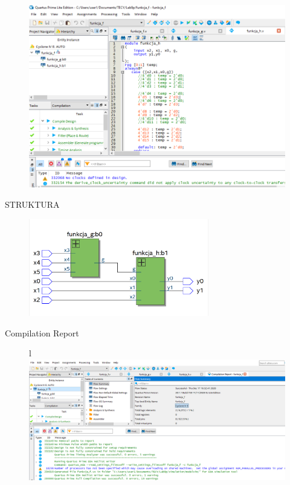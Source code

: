 \documentclass[]{article}
\begin{document}
\begin{figure}[H]
	\centering
	\includegraphics[width=1.39\textwidth]{1.17.png}
\end{figure}
\begin{center}
    STRUKTURA
\end{center}
\begin{figure}[H]
	\centering
	\includegraphics[width=0.70\textwidth]{1.18.png}
\end{figure}
\begin{center}
    Compilation Report
\end{center}
\begin{figure}[H]{l}
	\includegraphics[width=1.50\textwidth]{1.19.png}
\end{figure}
\newpage
\end{document}
